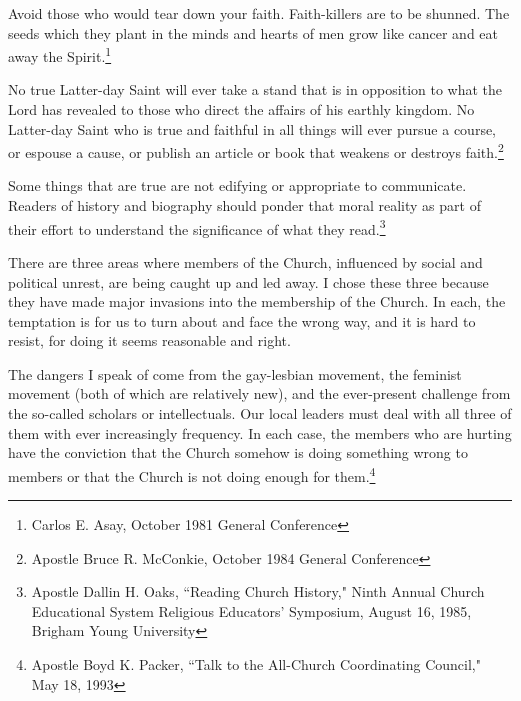\begin{displayquote}
Avoid those who would tear down your faith. Faith-killers are to be shunned. The
seeds which they plant in the minds and hearts of men grow like cancer and eat
away the Spirit.\footnote{Carlos E. Asay, October 1981 General Conference}
\end{displayquote}

\begin{displayquote}
No true Latter-day Saint will ever take a stand that is in opposition to what the 
Lord has revealed to those who direct the affairs of his earthly kingdom. No 
Latter-day Saint who is true and faithful in all things will ever pursue a course, 
or espouse a cause, or publish an article or book that weakens or destroys 
faith.\footnote{Apostle Bruce R. McConkie, October 1984 General Conference}
\end{displayquote}

\begin{displayquote}
Some things that are true are not edifying or appropriate to communicate. Readers 
of history and biography should ponder that moral reality as part of their effort to 
understand the significance of what they read.\footnote{Apostle Dallin H. Oaks, 
``Reading Church History," Ninth Annual Church Educational System Religious 
Educators' Symposium, August 16, 1985, Brigham Young University}
\end{displayquote}

\begin{displayquote}
There are three areas where members of the Church, influenced by social and political
unrest, are being caught up and led away. I chose these three because they have made
major invasions into the membership of the Church. In each, the temptation is for us
to turn about and face the wrong way, and it is hard to resist, for doing it seems
reasonable and right.

The dangers I speak of come from the gay-lesbian movement, the feminist movement
(both of which are relatively new), and the ever-present challenge from the so-called
scholars or intellectuals. Our local leaders must deal with all three of them with
ever increasingly frequency. In each case, the members who are hurting have the
conviction that the Church somehow is doing something wrong to members or that the
Church is not doing enough for them.\footnote{Apostle Boyd K. Packer, 
``Talk to the All-Church Coordinating Council," May 18, 1993}
\end{displayquote}

